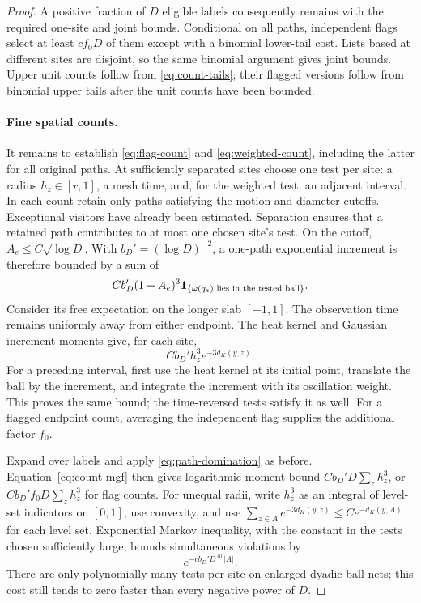 \begin{proof}
A positive fraction of $D$ eligible labels consequently remains with
the required one-site and joint bounds.  Conditional on all paths,
independent flags select at least $cf_0D$ of them except with a
binomial lower-tail cost.  Lists based at different sites are disjoint,
so the same binomial argument gives joint bounds.  Upper unit counts
follow from \eqref{eq:count-tails}; their flagged versions follow from
binomial upper tails after the unit counts have been bounded.

\paragraph{Fine spatial counts.}
It remains to establish \eqref{eq:flag-count} and
\eqref{eq:weighted-count}, including the latter for all original
paths.  At sufficiently separated sites choose one test per site:
a radius $h_z\in[r,1]$, a mesh time, and, for the weighted test, an
adjacent interval.  In each count retain only paths satisfying the
motion and diameter cutoffs.  Exceptional visitors have already been
estimated.  Separation ensures that a retained path contributes to
at most one chosen site's test.  On the cutoff,
$A_e\le C\sqrt{\log D}$.  With $b_D'=(\log D)^{-2}$, a one-path
exponential increment is therefore bounded by a sum of
\[
 Cb_D'(1+A_e)^3
             \mathbf 1_{\{\omega(q_z)\text{ lies in the tested ball}\}}.
\]
Consider its free expectation on the longer slab $[-1,1]$.  The
observation time remains uniformly away from either endpoint.  The
heat kernel and Gaussian increment moments give, for each site,
\[
                       Cb_D'h_z^3 e^{-3d_K(y,z)}.
\]
For a preceding interval, first use the heat kernel at its initial
point, translate the ball by the increment, and integrate the
increment with its oscillation weight.  This proves the same bound;
the time-reversed tests satisfy it as well.  For a flagged endpoint
count, averaging the independent flag supplies the additional factor
$f_0$.

Expand over labels and apply \eqref{eq:path-domination} as before.
Equation~\eqref{eq:count-mgf} then gives logarithmic moment bound
$Cb_D'D\sum_z h_z^3$, or $Cb_D'f_0D\sum_z h_z^3$ for flag counts.
For unequal radii, write $h_z^3$ as an integral of level-set indicators
on $[0,1]$, use convexity, and use
$\sum_{z\in A}e^{-3d_K(y,z)}\le Ce^{-d_K(y,A)}$ for each level
set.  Exponential Markov inequality, with the constant in the tests
chosen sufficiently large, bounds simultaneous violations by
\[
                          e^{-cb_D'D^{.01}|A|}.
\]
There are only polynomially many tests per site on enlarged dyadic
ball nets; this cost still tends to zero faster than every negative
power of $D$.


\end{proof}

